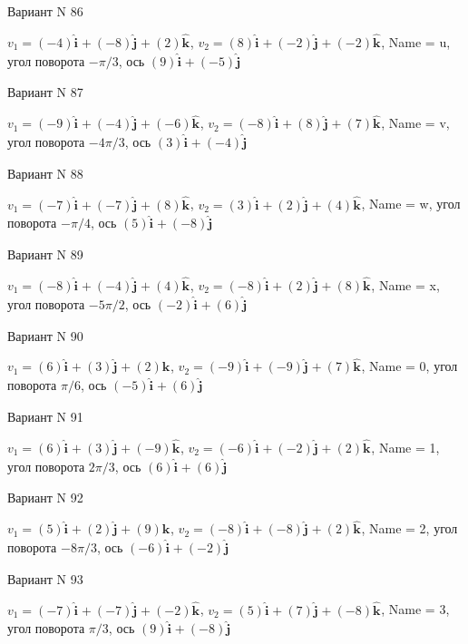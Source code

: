 \documentclass[11pt]{report}
\begin{document}
Вариант N 86

$v_1 = (-4)\mathbf{\hat{i}_{}} + (-8)\mathbf{\hat{j}_{}} + (2)\mathbf{\hat{k}_{}}$, $v_2 = (8)\mathbf{\hat{i}_{}} + (-2)\mathbf{\hat{j}_{}} + (-2)\mathbf{\hat{k}_{}}$, Name = u, угол поворота $- \pi / 3$, ось $(9)\mathbf{\hat{i}_{}} + (-5)\mathbf{\hat{j}_{}}$

Вариант N 87

$v_1 = (-9)\mathbf{\hat{i}_{}} + (-4)\mathbf{\hat{j}_{}} + (-6)\mathbf{\hat{k}_{}}$, $v_2 = (-8)\mathbf{\hat{i}_{}} + (8)\mathbf{\hat{j}_{}} + (7)\mathbf{\hat{k}_{}}$, Name = v, угол поворота $- 4 \pi / 3$, ось $(3)\mathbf{\hat{i}_{}} + (-4)\mathbf{\hat{j}_{}}$

Вариант N 88

$v_1 = (-7)\mathbf{\hat{i}_{}} + (-7)\mathbf{\hat{j}_{}} + (8)\mathbf{\hat{k}_{}}$, $v_2 = (3)\mathbf{\hat{i}_{}} + (2)\mathbf{\hat{j}_{}} + (4)\mathbf{\hat{k}_{}}$, Name = w, угол поворота $- \pi / 4$, ось $(5)\mathbf{\hat{i}_{}} + (-8)\mathbf{\hat{j}_{}}$

Вариант N 89

$v_1 = (-8)\mathbf{\hat{i}_{}} + (-4)\mathbf{\hat{j}_{}} + (4)\mathbf{\hat{k}_{}}$, $v_2 = (-8)\mathbf{\hat{i}_{}} + (2)\mathbf{\hat{j}_{}} + (8)\mathbf{\hat{k}_{}}$, Name = x, угол поворота $- 5 \pi / 2$, ось $(-2)\mathbf{\hat{i}_{}} + (6)\mathbf{\hat{j}_{}}$

Вариант N 90

$v_1 = (6)\mathbf{\hat{i}_{}} + (3)\mathbf{\hat{j}_{}} + (2)\mathbf{\hat{k}_{}}$, $v_2 = (-9)\mathbf{\hat{i}_{}} + (-9)\mathbf{\hat{j}_{}} + (7)\mathbf{\hat{k}_{}}$, Name = 0, угол поворота $\pi / 6$, ось $(-5)\mathbf{\hat{i}_{}} + (6)\mathbf{\hat{j}_{}}$

Вариант N 91

$v_1 = (6)\mathbf{\hat{i}_{}} + (3)\mathbf{\hat{j}_{}} + (-9)\mathbf{\hat{k}_{}}$, $v_2 = (-6)\mathbf{\hat{i}_{}} + (-2)\mathbf{\hat{j}_{}} + (2)\mathbf{\hat{k}_{}}$, Name = 1, угол поворота $2 \pi / 3$, ось $(6)\mathbf{\hat{i}_{}} + (6)\mathbf{\hat{j}_{}}$

Вариант N 92

$v_1 = (5)\mathbf{\hat{i}_{}} + (2)\mathbf{\hat{j}_{}} + (9)\mathbf{\hat{k}_{}}$, $v_2 = (-8)\mathbf{\hat{i}_{}} + (-8)\mathbf{\hat{j}_{}} + (2)\mathbf{\hat{k}_{}}$, Name = 2, угол поворота $- 8 \pi / 3$, ось $(-6)\mathbf{\hat{i}_{}} + (-2)\mathbf{\hat{j}_{}}$

Вариант N 93

$v_1 = (-7)\mathbf{\hat{i}_{}} + (-7)\mathbf{\hat{j}_{}} + (-2)\mathbf{\hat{k}_{}}$, $v_2 = (5)\mathbf{\hat{i}_{}} + (7)\mathbf{\hat{j}_{}} + (-8)\mathbf{\hat{k}_{}}$, Name = 3, угол поворота $\pi / 3$, ось $(9)\mathbf{\hat{i}_{}} + (-8)\mathbf{\hat{j}_{}}$
\end{document}
